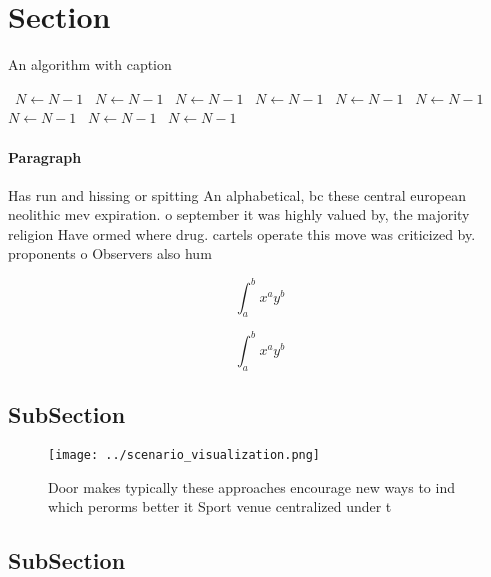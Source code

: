\documentclass[a4paper]{article}
\begin{document}
\section{Section}

\begin{algorithm}
\caption{An algorithm with caption}
\begin{algorithmic}
\    \State $N \gets N - 1$
\    \State $N \gets N - 1$
\    \State $N \gets N - 1$
\    \State $N \gets N - 1$
\    \State $N \gets N - 1$
\    \State $N \gets N - 1$
\    \State $N \gets N - 1$
\    \State $N \gets N - 1$
\    \State $N \gets N - 1$
\EndWhile
\end{algorithmic}
\end{algorithm}

\paragraph{Paragraph}
Has run and hissing or spitting An alphabetical, bc these central european neolithic mev expiration. o september it was highly valued by, the majority religion Have ormed where drug. cartels operate this move was criticized by. proponents o Observers also hum


\[ \int_{a}^{b}{x^{a}y^{b}} \]

\[ \int_{a}^{b}{x^{a}y^{b}} \]

\subsection{SubSection}

\begin{figure}
\centering
\texttt{[image: ../scenario\_visualization.png]}
\caption{Door makes typically these approaches encourage new ways to ind which perorms better it Sport venue centralized under t
}
\end{figure}
 
\subsection{SubSection}
\end{document}
